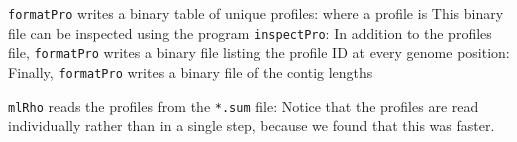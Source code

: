\documentclass{sig-alternate}
\newcommand{\ty}{\texttt}
\begin{document}
\ty{formatPro} writes a binary table of unique
profiles:
where a profile is
This binary file can be inspected using the program \ty{inspectPro}:
In addition to the profiles file, \ty{formatPro} writes a binary file
listing the profile ID at every genome position:
Finally, \ty{formatPro} writes a binary file of the contig lengths

\ty{mlRho} reads the profiles from the \ty{*.sum} file:
Notice that the profiles are read individually rather than in a single
step, because we found that this was
faster. 
\end{document}
